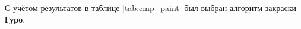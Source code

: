 С учётом результатов в таблице \ref{tab:cmp_paint} был выбран алгоритм закраски \textbf{Гуро}.

%
%
%
%
%
%
